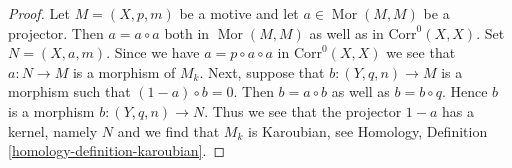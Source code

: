\documentclass[10pt,a4paper]{amsart}
\theoremstyle{plain}
\theoremstyle{definition}
\theoremstyle{remark}
\numberwithin{equation}{subsection}
\def\Mor{\mathop{\mathrm{Mor}}\nolimits}
\begin{document}
\begin{proof}
Let $M = (X, p, m)$ be a motive and let $a \in \Mor(M, M)$
be a projector. Then $a = a \circ a$ both in $\Mor(M, M)$
as well as in $\text{Corr}^0(X, X)$. Set $N = (X, a, m)$.
Since we have $a = p \circ a \circ a$ in $\text{Corr}^0(X, X)$
we see that $a : N \to M$ is a morphism of $M_k$.
Next, suppose that $b : (Y, q, n) \to M$ is a morphism
such that $(1 - a) \circ b = 0$. Then $b = a \circ b$ as well as
$b = b \circ q$. Hence $b$ is a morphism $b : (Y, q, n) \to N$.
Thus we see that the projector $1 - a$ has a kernel, namely $N$
and we find that $M_k$ is Karoubian, see
Homology, Definition \ref{homology-definition-karoubian}.
\end{proof}
\end{document}
